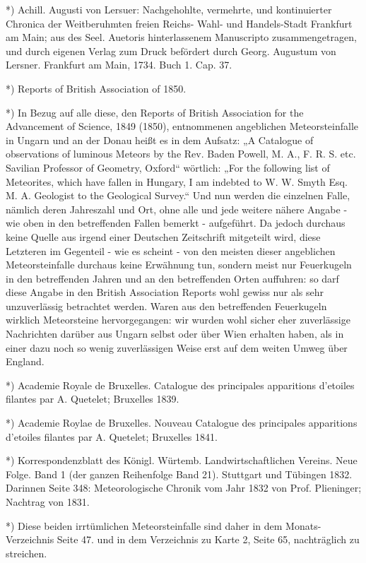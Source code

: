 \documentclass[a4paper, 11pt, oneside, polutonikogreek, german]{article}
\begin{document}
*) Achill. Augusti von Lersuer: Nachgehohlte, vermehrte, und kontinuierter Chronica der Weitberuhmten freien Reichs- Wahl- und Handels-Stadt Frankfurt am Main; aus des Seel. Auetoris hinterlassenem Manuscripto zusammengetragen, und durch eigenen Verlag zum Druck befördert durch Georg. Augustum von Lersner. Frankfurt am Main, 1734. Buch 1. Cap. 37.

*) Reports of British Association of 1850.

*) In Bezug auf alle diese, den Reports of British Association for the Advancement of Science, 1849 (1850), entnommenen angeblichen Meteorsteinfalle in Ungarn und an der Donau heißt es in dem Aufsatz: „A Catalogue of observations of luminous Meteors by the Rev. Baden Powell, M. A., F. R. S. etc. Savilian Professor of Geometry, Oxford“ wörtlich: „For the following list of Meteorites, which have fallen in Hungary, I am indebted to W. W. Smyth Esq. M. A. Geologist to the Geological Survey.“ Und nun werden die einzelnen Falle, nämlich deren Jahreszahl und Ort, ohne alle und jede weitere nähere Angabe - wie oben in den betreffenden Fallen bemerkt - aufgeführt. Da jedoch durchaus keine Quelle aus irgend einer Deutschen Zeitschrift mitgeteilt wird, diese Letzteren im Gegenteil - wie es scheint - von den meisten dieser angeblichen Meteorsteinfalle durchaus keine Erwähnung tun, sondern meist nur Feuerkugeln in den betreffenden Jahren und an den betreffenden Orten auffuhren: so darf diese Angabe in den British Association Reports wohl gewiss nur als sehr unzuverlässig betrachtet werden. Waren aus den betreffenden Feuerkugeln wirklich Meteorsteine hervorgegangen: wir wurden wohl sicher eher zuverlässige Nachrichten darüber aus Ungarn selbst oder über Wien erhalten haben, als in einer dazu noch so wenig zuverlässigen Weise erst auf dem weiten Umweg über England.

*) Academie Royale de Bruxelles. Catalogue des principales apparitions d'etoiles filantes par A. Quetelet; Bruxelles 1839.

*) Academie Roylae de Bruxelles. Nouveau Catalogue des principales apparitions d'etoiles filantes par A. Quetelet; Bruxelles 1841.

*) Korrespondenzblatt des Königl. Würtemb. Landwirtschaftlichen Vereins. Neue Folge. Band 1 (der ganzen Reihenfolge Band 21). Stuttgart und Tübingen 1832. Darinnen Seite 348: Meteorologische Chronik vom Jahr 1832 von Prof. Plieninger; Nachtrag von 1831.

*) Diese beiden irrtümlichen Meteorsteinfalle sind daher in dem Monats-Verzeichnis Seite 47. und in dem Verzeichnis zu Karte 2, Seite 65, nachträglich zu streichen.
\end{document}
